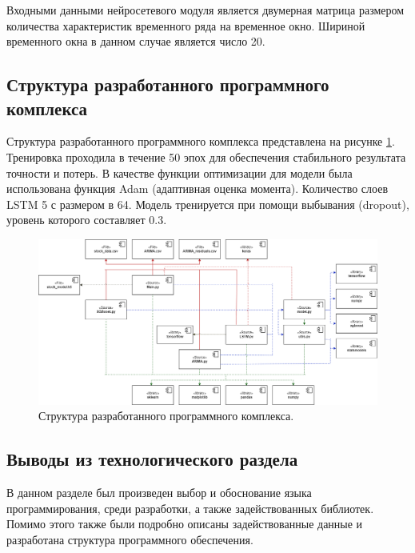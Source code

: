 \par Входными данными нейросетевого модуля является двумерная матрица размером количества характеристик временного ряда на временное окно. Шириной временного окна в данном случае является число 20.

\newpage

\subsection{Структура разработанного программного комплекса}

\par Структура разработанного программного комплекса представлена на рисунке \ref{fig:final-scheme}. Тренировка проходила в течение 50 эпох для обеспечения стабильного результата точности и потерь. В качестве функции оптимизации для модели была использована функция Adam (адаптивная оценка момента). Количество слоев LSTM 5 с размером в 64. Модель тренируется при помощи выбывания (dropout), уровень которого составляет 0.3.

\begin{figure}[hbtp]
  \centering
  \includegraphics[width=\textwidth]{img/software-structure .png}
  \caption{Структура разработанного программного комплекса.}
  \label{fig:final-scheme}
\end{figure}
\newpage
\subsection{Выводы из технологического раздела}
\par В данном разделе был произведен выбор и обоснование языка программирования, среди разработки, а также задействованных библиотек. Помимо этого также были подробно описаны задействованные данные и разработана структура программного обеспечения.
\pagebreak